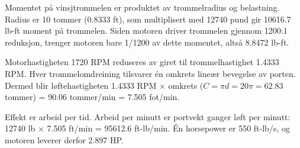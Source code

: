
Momentet på vinsjtrommelen er produktet av trommelradius og belastning. Radius er 10 tommer (0.8333 ft), som multiplisert med 12740 pund gir 10616.7 lb-ft moment på trommelen. Siden motoren driver trommelen gjennom 1200:1 reduksjon, trenger motoren bare 1/1200 av dette momentet, altså 8.8472 lb-ft.

\vskip 10pt

Motorhastigheten 1720 RPM reduseres av giret til trommelhastighet 1.4333 RPM. Hver trommelomdreining tilsvarer én omkrets lineær bevegelse av porten. Dermed blir løftehastigheten 1.4333 RPM $\times$ omkrets ($C = \pi d = 20\pi = 62.83$ tommer) = 90.06 tommer/min = 7.505 fot/min.

\vskip 10pt

Effekt er arbeid per tid. Arbeid per minutt er portvekt ganger løft per minutt: 12740 lb $\times$ 7.505 ft/min = 95612.6 ft-lb/min. Én horsepower er 550 ft-lb/s, og motoren leverer derfor 2.897 HP.



